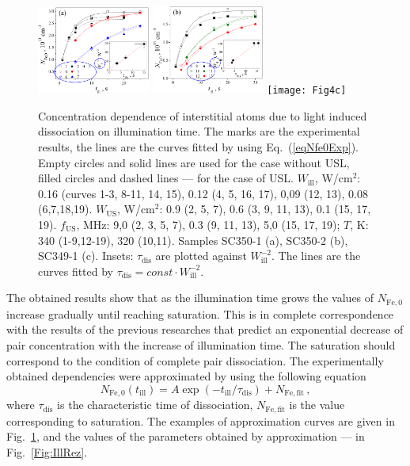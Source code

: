 \documentclass[%
 aip,jap,
 amsmath,amssymb,
 reprint,%
]{revtex4-1}
\begin{document}
\begin{figure}
\includegraphics[width=0.33\textwidth]{Fig4a}%
\includegraphics[width=0.33\textwidth]{Fig4b}%
\texttt{[image: Fig4c]}%
\caption{\label{Fig:Nfe_till}
Concentration dependence of interstitial atoms due to light induced dissociation on illumination time.
The marks are the experimental results, the lines are the curves  fitted by using Eq.~(\ref{eqNfe0Exp}).
Empty circles and solid lines are used for  the case without USL,
filled circles and dashed lines --- for the case of USL.
$W_\mathrm{ill}$, W/cm$^2$: 0.16 (curves 1-3, 8-11, 14, 15),
0.12 (4, 5, 16, 17), 0,09 (12, 13), 0.08 (6,7,18,19).
$W_\mathrm{US}$, W/cm$^2$:
0.9 (2, 5, 7), 0.6 (3, 9, 11, 13), 0.1 (15, 17, 19).
$f_\mathrm{US}$, MHz:
9,0 (2, 3, 5, 7), 0.3 (9, 11, 13), 5,0 (15, 17, 19);
$T$, K:
340 (1-9,12-19), 320 (10,11).
Samples SC350-1 (a), SC350-2 (b), SC349-1 (c).
Insets: $\tau_\mathrm{dis}$ are plotted against $W_\mathrm{ill}^{-2}$.
The lines are the curves fitted by $\tau_\mathrm{dis}=const\cdot W_\mathrm{ill}^{-2}$.
}
\end{figure}


The obtained results show that as the illumination time grows
the values of $N_\mathrm{Fe,0}$ increase gradually until reaching saturation.
This is in complete correspondence with the results of the previous researches \cite{FeBLight2,FeBAssJAP2014,FeBKin2019}
that predict an exponential decrease of pair concentration with the increase of illumination time.
The saturation should correspond to the condition of complete pair dissociation.
The experimentally obtained dependencies were approximated by using the following equation
\begin{equation}
\label{eqNfe0Exp}
N_\mathrm{Fe,0}(t_\mathrm{ill})=A\exp(-t_\mathrm{ill}/\tau_\mathrm{dis})
+N_\mathrm{Fe,fit}\,,
\end{equation}
where
$\tau_\mathrm{dis}$ is the characteristic time of dissociation,
$N_\mathrm{Fe,fit}$ is the value corresponding to saturation.
The examples of approximation curves are given in Fig.~\ref{Fig:Nfe_till},
and the values of the parameters obtained by approximation --- in Fig.~\ref{Fig:IllRez}.
\end{document}

